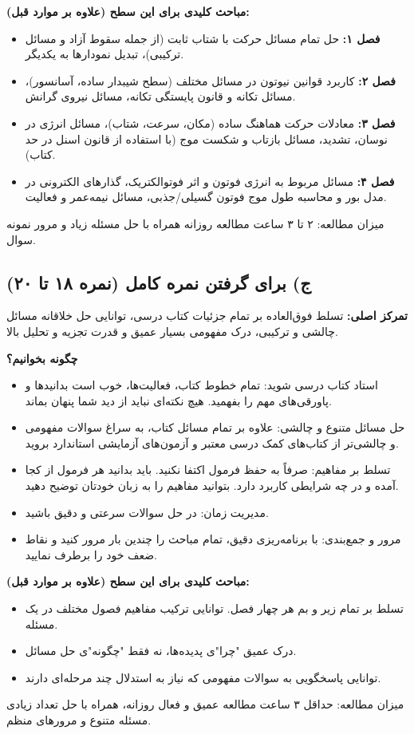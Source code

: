 \documentclass[12pt]{article}
\begin{document}
\textbf{مباحث کلیدی برای این سطح (علاوه بر موارد قبل):}
\begin{itemize}
    \item \textbf{فصل ۱:} حل تمام مسائل حرکت با شتاب ثابت (از جمله سقوط آزاد و مسائل ترکیبی)، تبدیل نمودارها به یکدیگر.
    \item \textbf{فصل ۲:} کاربرد قوانین نیوتون در مسائل مختلف (سطح شیبدار ساده، آسانسور)، مسائل تکانه و قانون پایستگی تکانه، مسائل نیروی گرانش.
    \item \textbf{فصل ۳:} معادلات حرکت هماهنگ ساده (مکان، سرعت، شتاب)، مسائل انرژی در نوسان، تشدید، مسائل بازتاب و شکست موج (با استفاده از قانون اسنل در حد کتاب).
    \item \textbf{فصل ۴:} مسائل مربوط به انرژی فوتون و اثر فوتوالکتریک، گذارهای الکترونی در مدل بور و محاسبه طول موج فوتون گسیلی/جذبی، مسائل نیمه‌عمر و فعالیت.
\end{itemize}
میزان مطالعه: ۲ تا ۳ ساعت مطالعه روزانه همراه با حل مسئله زیاد و مرور نمونه سوال.

\subsection{ج) برای گرفتن نمره کامل (نمره ۱۸ تا ۲۰)}

\textbf{تمرکز اصلی:} تسلط فوق‌العاده بر تمام جزئیات کتاب درسی، توانایی حل خلاقانه مسائل چالشی و ترکیبی، درک مفهومی بسیار عمیق و قدرت تجزیه و تحلیل بالا.

\textbf{چگونه بخوانیم؟}
\begin{itemize}
    \item استاد کتاب درسی شوید: تمام خطوط کتاب، فعالیت‌ها، خوب است بدانیدها و پاورقی‌های مهم را بفهمید. هیچ نکته‌ای نباید از دید شما پنهان بماند.
    \item حل مسائل متنوع و چالشی: علاوه بر تمام مسائل کتاب، به سراغ سوالات مفهومی و چالشی‌تر از کتاب‌های کمک درسی معتبر و آزمون‌های آزمایشی استاندارد بروید.
    \item تسلط بر مفاهیم: صرفاً به حفظ فرمول اکتفا نکنید. باید بدانید هر فرمول از کجا آمده و در چه شرایطی کاربرد دارد. بتوانید مفاهیم را به زبان خودتان توضیح دهید.
    \item مدیریت زمان: در حل سوالات سرعتی و دقیق باشید.
    \item مرور و جمع‌بندی: با برنامه‌ریزی دقیق، تمام مباحث را چندین بار مرور کنید و نقاط ضعف خود را برطرف نمایید.
\end{itemize}

\textbf{مباحث کلیدی برای این سطح (علاوه بر موارد قبل):}
\begin{itemize}
    \item تسلط بر تمام زیر و بم هر چهار فصل. توانایی ترکیب مفاهیم فصول مختلف در یک مسئله.
    \item درک عمیق "چرا"ی پدیده‌ها، نه فقط "چگونه"ی حل مسائل.
    \item توانایی پاسخگویی به سوالات مفهومی که نیاز به استدلال چند مرحله‌ای دارند.
\end{itemize}
میزان مطالعه: حداقل ۳ ساعت مطالعه عمیق و فعال روزانه، همراه با حل تعداد زیادی مسئله متنوع و مرورهای منظم.
\end{document}

